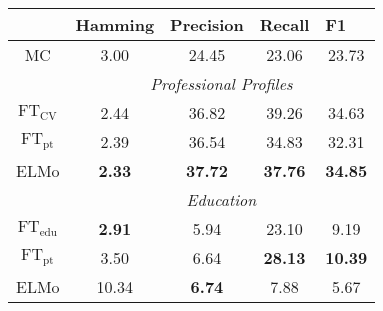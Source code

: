 \begin{table}[tb]
\centering 
\begin{tabular}{@{}ccccc@{}}
\toprule

                & \multicolumn{1}{l}{Hamming} & \multicolumn{1}{l}{Precision} & \multicolumn{1}{l}{Recall} & \multicolumn{1}{l}{F1} \\
                \midrule
\small{MC}     & 3.00                                 & 24.45                         & 23.06                      & 23.73                  \\
                                \midrule

                & \multicolumn{4}{c}{\textit{Professional  Profiles}}                                                                        \\
$\text{FT}_{\text{CV}}$  & 2.44                                 & 36.82                         & 39.26                      & 34.63                  \\
$\text{FT}_{\text{pt}}$  & 2.39                                 & 36.54                         & 34.83                      & 32.31                  \\
ELMo            & \textbf{2.33}                                 &  \textbf{37.72}                      & \textbf{37.76}                      & \textbf{34.85}                  \\
                                \midrule

                & \multicolumn{4}{c}{\textit{Education}}                                                                        \\
$\text{FT}_{\text{edu}}$ & \textbf{2.91}                                 & 5.94                         & 23.10                      & 9.19                  \\
$\text{FT}_{\text{pt}}$  & 3.50                                 & 6.64                         & \textbf{28.13}                      & \textbf{10.39}                  \\
ELMo            & 10.34                                & \textbf{6.74}                          & 7.88                       & 5.67              \\ \bottomrule
\end{tabular}
\label{tab:sk}
\end{table}